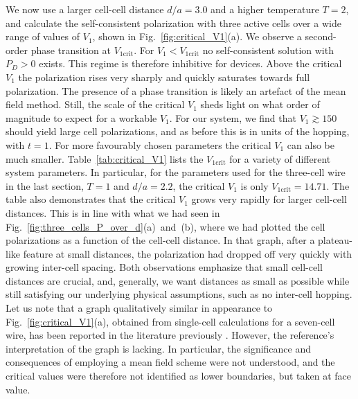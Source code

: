 We now use a larger cell-cell distance $d/a = 3.0$ and a higher temperature $T =
2$, and calculate the self-consistent polarization with three active cells over
a wide range of values of $V_1$, shown in Fig.~\ref{fig:critical_V1}(a). We
observe a second-order phase transition at $V_{1\textrm{crit}}$. For $V_1 <
V_{1\textrm{crit}}$ no self-consistent solution with $P_D > 0 $ exists. This
regime is therefore inhibitive for  devices. Above the critical $V_1$
the polarization rises very sharply and quickly saturates towards full
polarization. The presence of a phase transition is likely an artefact of the
mean field method. Still, the scale of the critical $V_1$ sheds light on what
order of magnitude to expect for a workable $V_1$. For our system, we find that
$V_1 \gtrsim 150$ should yield large cell polarizations, and as before this is
in units of the hopping, with $t = 1$. For more favourably chosen parameters the
critical $V_1$ can also be much smaller. Table~\ref{tab:critical_V1} lists the
$V_{1\textrm{crit}}$ for a variety of different system parameters. In
particular, for the parameters used for the three-cell wire in the last section,
$T = 1$ and $d/a = 2.2$, the critical $V_1$ is only $V_{1\textrm{crit}} =
14.71$. The table also demonstrates that the critical $V_1$ grows very rapidly
for larger cell-cell distances. This is in line with what we had seen in
Fig.~\ref{fig:three_cells_P_over_d}(a)~and~(b), where we had plotted the cell
polarizations as a function of the cell-cell distance. In that graph, after a
plateau-like feature at small distances, the polarization had dropped off very
quickly with growing inter-cell spacing. Both observations emphasize that small
cell-cell distances are crucial, and, generally, we want distances as small as
possible while still satisfying our underlying physical assumptions, such as no
inter-cell hopping. Let us note that a graph qualitatively similar in appearance
to Fig.~\ref{fig:critical_V1}(a), obtained from single-cell 
calculations for a seven-cell wire, has been reported in the literature
previously \cite{lent1993lines}. However, the reference's interpretation of the
graph is lacking. In particular, the significance and consequences of employing
a mean field scheme were not understood, and the critical values were therefore
not identified as lower boundaries, but taken at face value.

